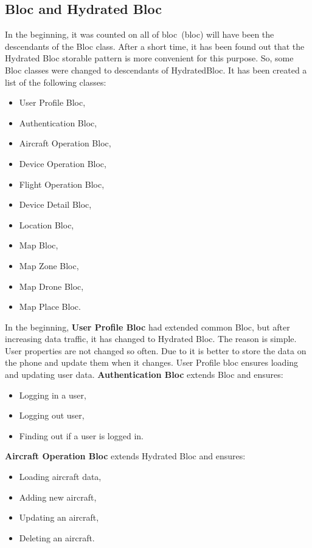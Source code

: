 \subsection{Bloc and Hydrated Bloc}\label{subsec:bloc-and-hydrated-bloc}
In the beginning, it was counted on all of \acrshort{bloc}~(\acrlong{bloc}) will have been the descendants of the Bloc class.
After a short time, it has been found out that the Hydrated Bloc storable pattern is more convenient for this purpose.
So, some Bloc classes were changed to descendants of HydratedBloc.
It has been created a list of the following classes:
\begin{itemize}
    \item User Profile Bloc,
    \item Authentication Bloc,
    \item Aircraft Operation Bloc,
    \item Device Operation Bloc,
    \item Flight Operation Bloc,
    \item Device Detail Bloc,
    \item Location Bloc,
    \item Map Bloc,
    \item Map Zone Bloc,
    \item Map Drone Bloc,
    \item Map Place Bloc.
\end{itemize}
In the beginning, \textbf{User Profile Bloc} had extended common Bloc, but after increasing data traffic, it has changed to Hydrated Bloc.
The reason is simple.
User properties are not changed so often.
Due to it is better to store the data on the phone and update them when it changes.
User Profile bloc ensures loading and updating user data.
\newline
\newline
\newline
\textbf{Authentication Bloc} extends Bloc and ensures:
\begin{itemize}
    \item Logging in a user,
    \item Logging out user,
    \item Finding out if a user is logged in.
\end{itemize}
\textbf{Aircraft Operation Bloc} extends Hydrated Bloc and ensures:
\begin{itemize}
    \item Loading aircraft data,
    \item Adding new aircraft,
    \item Updating an aircraft,
    \item Deleting an aircraft.
\end{itemize}
